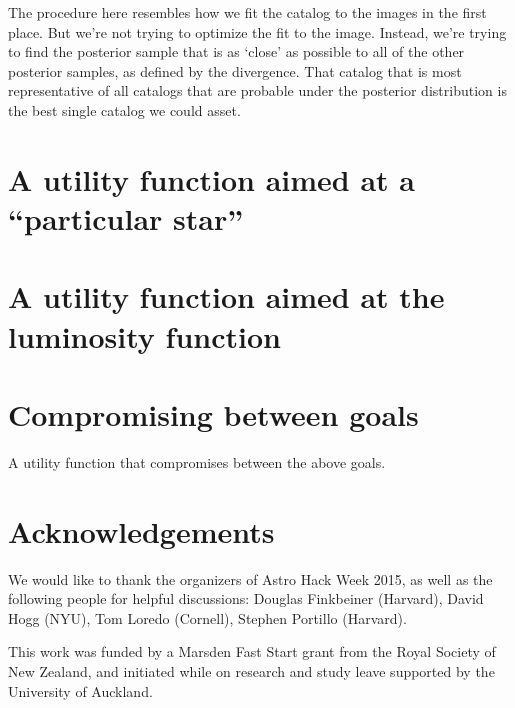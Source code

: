 \documentclass[a4paper,fleqn,usenatbib]{mnras}
\begin{document}
The procedure here resembles how we fit the catalog to the images in the
first place. But we're not trying to optimize the fit to the image. Instead,
we're trying to find the posterior sample that is as `close' as possible to
all of the other posterior samples, as defined by the divergence. That catalog
that is most representative of all catalogs that are probable under the
posterior distribution is the best single catalog we could asset.

\section{A utility function aimed at a ``particular star''}


\section{A utility function aimed at the luminosity function}


\section{Compromising between goals}
A utility function that compromises between the above goals.



\section*{Acknowledgements}
We would like to thank the organizers of Astro Hack Week 2015, as well
as the following people for helpful discussions:
Douglas Finkbeiner (Harvard), David Hogg (NYU), Tom Loredo (Cornell),
Stephen Portillo (Harvard).

This work was funded by a Marsden Fast Start grant from the Royal Society of
New Zealand, and initiated while on research and study leave supported by
the University of Auckland. 












\bsp	%
\label{lastpage}
\end{document}
